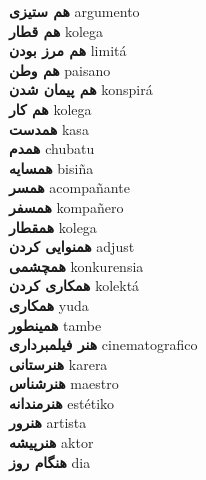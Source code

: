 \textbf{ هم ستیزی  } argumento \\
\textbf{ هم قطار  } kolega \\
\textbf{ هم مرز بودن  } limitá \\
\textbf{ هم وطن  } paisano \\
\textbf{ هم پیمان شدن  } konspirá \\
\textbf{ هم کار  } kolega \\
\textbf{ همدست  } kasa \\
\textbf{ همدم  } chubatu \\
\textbf{ همسایه  } bisiña \\
\textbf{ همسر  } acompañante \\
\textbf{ همسفر  } kompañero \\
\textbf{ همقطار  } kolega \\
\textbf{ همنوایی کردن  } adjust \\
\textbf{ همچشمی  } konkurensia \\
\textbf{ همکاری کردن  } kolektá \\
\textbf{ همکاری  } yuda \\
\textbf{ همینطور  } tambe \\
\textbf{ هنر فیلمبرداری  } cinematografico \\
\textbf{ هنرستانی  } karera \\
\textbf{ هنرشناس  } maestro \\
\textbf{ هنرمندانه  } estétiko \\
\textbf{ هنرور  } artista \\
\textbf{ هنرپیشه  } aktor \\
\textbf{ هنگام روز  } dia \\
